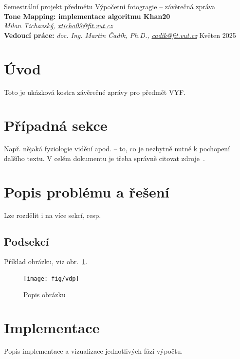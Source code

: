 \documentclass[11pt,a4paper,oneside]{article}
\begin{document}
\thispagestyle{empty}
\begin{center}
\vspace*{60mm}
{Semestrální projekt předmětu Výpočetní fotogragie -- závěrečná zpráva }\\
\smallskip
{\Large\bf Tone Mapping: implementace algoritmu Khan20}\\
\smallskip
{\it Milan Tichavský, \url{xticha09@fit.vut.cz}}\\
\vfill
{\bf Vedoucí práce:} {\it doc. Ing. Martin Čadík, Ph.D., \url{cadik@fit.vut.cz}} 
\hfill {Květen 2025}


\end{center}
\newpage


\section{Úvod}
Toto je ukázková kostra závěrečné zprávy pro předmět VYF.



\section{Případná sekce}
Např. nějaká fyziologie vidění apod. -- to, co je nezbytně nutné k pochopení
dalšího textu. V celém dokumentu je třeba správně citovat 
zdroje~\cite{Daly:1993:VDP:197765.197783}.


\section{Popis problému a řešení}
Lze rozdělit i na více sekcí, resp. 

\subsection{Podsekcí}
Příklad obrázku, viz obr.~\ref{fig:vdp}.


\begin{figure}[htb]
  \begin{center}
    \texttt{[image: fig/vdp]}
    \caption{Popis obrázku} 
    \label{fig:vdp}
  \end{center}
\end{figure}



\section{Implementace}
Popis implementace a vizualizace jednotlivých fází výpočtu.
\end{document}
